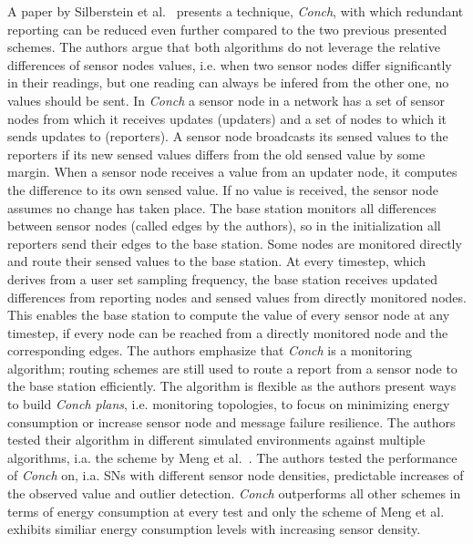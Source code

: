 A paper by Silberstein et al.~\cite{silberstein2006constraint} presents a
technique, \textit{Conch}, with which redundant reporting can be reduced even
further compared to the two previous presented schemes. The authors argue that
both algorithms do not leverage the relative differences of sensor nodes
values, i.e. when two sensor nodes differ significantly in their readings, but
one reading can always be infered from the other one, no values should be sent.
In \textit{Conch} a sensor node in a network has a set of sensor nodes from
which it receives updates (updaters) and a set of nodes to which it sends
updates to (reporters). A sensor node broadcasts its sensed values to the
reporters if its new sensed values differs from the old sensed value by some
margin. When a sensor node receives a value from an updater node, it computes
the difference to its own sensed value. If no value is received, the sensor
node assumes no change has taken place. The base station monitors all
differences between sensor nodes (called edges by the authors), so in the
initialization all reporters send their edges to the base station. Some nodes
are monitored directly and route their sensed values to the base station. At
every timestep, which derives from a user set sampling frequency, the base
station receives updated differences from reporting nodes and sensed values
from directly monitored nodes. This enables the base station to compute the
value of every sensor node at any timestep, if every node can be reached from a
directly monitored node and the corresponding edges. The authors emphasize that
\textit{Conch} is a monitoring algorithm; routing schemes are still used to
route a report from a sensor node to the base station efficiently. The
algorithm is flexible as the authors present ways to build \textit{Conch
plans}, i.e. monitoring topologies, to focus on minimizing energy consumption
or increase sensor node and message failure resilience. The authors tested
their algorithm in different simulated environments against multiple
algorithms, i.a. the scheme by Meng et al.~\cite{meng2004event}. The authors
tested the performance of \textit{Conch} on, i.a. \acp{SN} with different
sensor node densities, predictable increases of the observed value and outlier
detection. \textit{Conch} outperforms all other schemes in terms of energy
consumption at every test and only the scheme of Meng et al. exhibits similiar
energy consumption levels with increasing sensor density.



